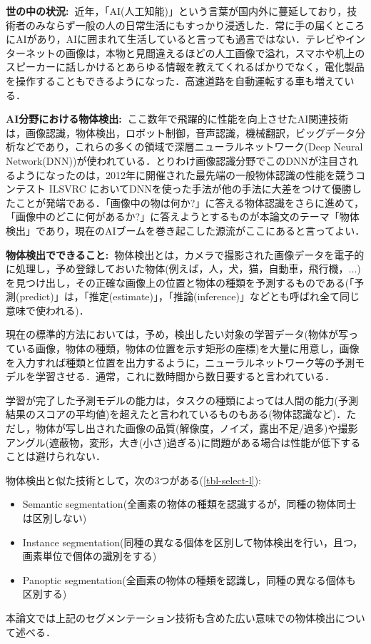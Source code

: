 \documentclass[originalpaper,fleqn]{jsaiart}     %
\begin{document}
{\bf 世の中の状況:\ }近年，「AI(人工知能)」という言葉が国内外に蔓延しており，技術者のみならず一般の人の日常生活にもすっかり浸透した．常に手の届くところにAIがあり，AIに囲まれて生活していると言っても過言ではない．テレビやインターネットの画像は，本物と見間違えるほどの人工画像で溢れ，スマホや机上のスピーカーに話しかけるとあらゆる情報を教えてくれるばかりでなく，電化製品を操作することもできるようになった．高速道路を自動運転する車も増えている．

{\bf AI分野における物体検出:\ }ここ数年で飛躍的に性能を向上させたAI関連技術は，画像認識，物体検出，ロボット制御，音声認識，機械翻訳，ビッグデータ分析などであり，これらの多くの領域で深層ニューラルネットワーク(Deep Neural Network(DNN))が使われている．とりわけ画像認識分野でこのDNNが注目されるようになったのは，2012年に開催された最先端の一般物体認識の性能を競うコンテスト ILSVRC においてDNNを使った手法が他の手法に大差をつけて優勝したことが発端である．「画像中の物は何か?」に答える物体認識をさらに進めて，「画像中のどこに何があるか?」に答えようとするものが本論文のテーマ「物体検出」であり，現在のAIブームを巻き起こした源流がここにあると言ってよい．

{\bf 物体検出でできること:\ }物体検出とは，カメラで撮影された画像データを電子的に処理し，予め登録しておいた物体(例えば，人，犬，猫，自動車，飛行機，...)を見つけ出し，その正確な画像上の位置と物体の種類を予測するものである(「予測(predict)」は，「推定(estimate)」，「推論(inference)」などとも呼ばれ全て同じ意味で使われる)．

現在の標準的方法においては，予め，検出したい対象の学習データ(物体が写っている画像，物体の種類，物体の位置を示す矩形の座標)を大量に用意し，画像を入力すれば種類と位置を出力するように，ニューラルネットワーク等の予測モデルを学習させる．通常，これに数時間から数日要すると言われている．

学習が完了した予測モデルの能力は，タスクの種類によっては人間の能力(予測結果のスコアの平均値)を超えたと言われているものもある(物体認識など)．ただし，物体が写し出された画像の品質(解像度，ノイズ，露出不足/過多)や撮影アングル(遮蔽物，変形，大き(小さ)過ぎる)に問題がある場合は性能が低下することは避けられない．

物体検出と似た技術として，次の3つがある(\ref{tbl-select-l}):

\begin{itemize}
    \item Semantic segmentation(全画素の物体の種類を認識するが，同種の物体同士は区別しない)
    \item Instance segmentation(同種の異なる個体を区別して物体検出を行い，且つ，画素単位で個体の識別をする)
    \item Panoptic segmentation(全画素の物体の種類を認識し，同種の異なる個体も区別する)
\end{itemize}
本論文では上記のセグメンテーション技術も含めた広い意味での物体検出について述べる．
\end{document}
